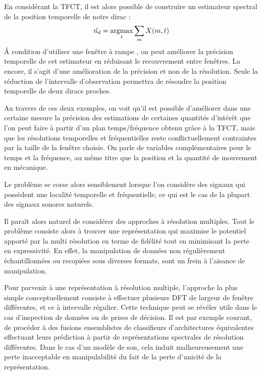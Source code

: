 En considérant la TFCT, il est alors possible de construire un estimateur \og spectral \fg de la position temporelle de notre dirac :
\begin{equation}
\hat{n_d} = \operatorname*{argmax}_t \sum_m X(m, t)
\end{equation}
\'A condition d'utiliser une fenêtre \fg à rampe \og, on peut améliorer la précision temporelle de cet estimateur en réduisant le recouvrement entre fenêtres. La encore, il s'agit d'une amélioration de la précision et non de la résolution. Seule la réduction de l'intervalle d'observation permettra de résoudre la position temporelle de deux diracs proches.

Au travers de ces deux exemples, on voit qu'il est possible d'améliorer dans une certaine mesure la précision des estimations de certaines quantités d'intérêt que l'on peut faire à partir d'un plan temps/fréquence obtenu grâce à la TFCT, mais que les résolutions temporelles et fréquentielles reste conflictuellement contraintes par la taille de la fenêtre choisie. On parle de variables complémentaires pour le temps et la fréquence, au même titre que la position et la quantité de mouvement en mécanique.

Le problème se corse alors sensiblement lorsque l'on considère des signaux qui possèdent une localité temporelle et fréquentielle, ce qui est le cas de la plupart des signaux sonores naturels.

Il paraît alors naturel de considérer des approches à résolution multiples. Tout le problème consiste alors à trouver une représentation qui maximise le potentiel apporté par la multi résolution en terme de fidélité tout en minimisant la perte en expressivité. En effet, la manipulation de données non régulièrement échantillonnées ou recopiées sous diverses formats, sont un frein à l'aisance de manipulation.

Pour parvenir à une représentation à résolution multiple, l'approche la plus simple conceptuellement consiste à \og effectuer \fg plusieurs DFT de largeur de fenêtre différentes, et ce à intervalle régulier. Cette technique peut se révéler utile dans le cas d'inspection de données ou de prises de décision. Il est par exemple courant, de procéder à des fusions ensemblistes de classifieurs d'architectures équivalentes effectuant leurs prédiction à partir de représentations spectrales de résolution différentes. Dans le cas d'un modèle de son, cela induit malheureusement une perte inacceptable en manipulabilité du fait de la perte d'unicité de la représentation.

